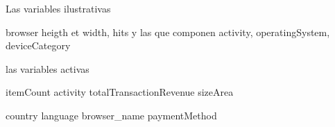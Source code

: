 Las variables ilustrativas

browser heigth et width, hits y las que componen activity, operatingSystem, deviceCategory

las variables activas

itemCount
activity
totalTransactionRevenue
sizeArea

country
language
browser_name
paymentMethod